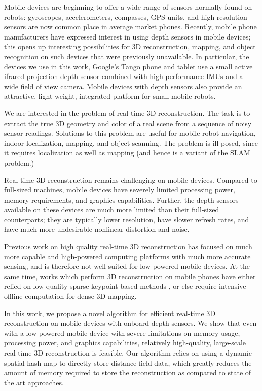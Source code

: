 Mobile devices are beginning to offer a wide range of sensors normally found on
robots: gyroscopes, accelerometers, compasses, GPS units, and high resolution
sensors are now common place in average market phones. Recently, mobile phone
manufacturers have expressed interest in using depth sensors in mobile devices;
this opens up interesting possibilities for 3D reconstruction, mapping,
and object recognition on such devices that were previously unavailable. In
particular, the devices we use in this work, Google's Tango \cite{Tango} phone
and tablet use a small active ifrared projection depth sensor combined with
high-performance IMUs and a wide field of view camera. Mobile devices with depth
sensors also provide an attractive, light-weight, integrated platform for small mobile robots.

We are interested in the problem of real-time 3D reconstruction. The task is to
extract the true 3D geometry and color of a real scene from a sequence of noisy
sensor readings. Solutions to this problem are useful for mobile robot navigation,
indoor localization, mapping, and object scanning. The problem is ill-posed,
since it requires localization as well as mapping (and hence is a variant of
the SLAM problem.)

Real-time 3D reconstruction remains challenging on mobile devices. Compared to
full-sized machines, mobile devices have severely limited processing power,
memory requirements, and graphics capabilities. Further, the depth sensors
available on these devices are much more limited than their full-sized
counterparts; they are typically lower resolution, have slower refresh rates,
and have much more undesirable nonlinear distortion and noise.

Previous work on high quality real-time 3D reconstruction \cite{Newcombe,
Whelan2013, Bylow2013, DTAM} has focused on much more capable and high-powered
computing platforms with much more accurate sensing, and is therefore not well
suited for low-powered mobile devices. At the same time, works which perform 3D
reconstruction on mobile phones have either relied on low quality sparse
keypoint-based methods \cite{KleinSparse}, or else require intensive offline
computation \cite{TanskanenMetric} for dense 3D mapping.

In this work, we propose a novel algorithm for efficient real-time 3D
reconstruction on mobile devices with onboard depth sensors. We show that even
with a low-powered mobile device with severe limitations on memory usage,
processing power, and graphics capabilities, relatively high-quality,
large-scale real-time 3D reconstruction is feasible. Our algorithm relies on
using a dynamic spatial hash map \cite{SpatialHashing} to directly store
distance field data, which greatly reduces the amount of memory required to
store the reconstruction as compared to state of the art approaches.

